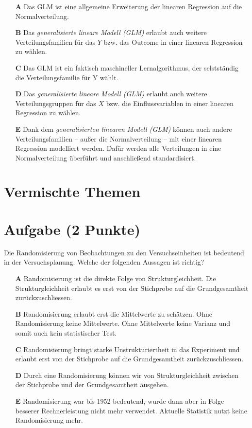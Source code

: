 \documentclass[a4paper, 9pt]{scrartcl}\usepackage[]{graphicx}\usepackage[]{xcolor}
\begin{document}
\begin{enumerate}
\item [\textbf{A} \msquare] Das GLM ist eine allgemeine Erweiterung der linearen Regression auf die Normalverteilung.
\item [\textbf{B} \msquare] Das \textit{generalisierte lineare Modell (GLM)} erlaubt auch weitere Verteilungsfamilien für das $Y$ bzw. das Outcome in einer linearen Regression zu wählen.
\item [\textbf{C} \msquare] Das GLM ist ein faktisch maschineller Lernalgorithmus, der selstständig die Verteilungsfamilie für Y wählt.
\item [\textbf{D} \msquare] Das \textit{generalisierte lineare Modell (GLM)} erlaubt auch weitere Verteilungsgruppen für das $X$ bzw. die Einflussvariablen in einer linearen Regression zu wählen.
\item [\textbf{E} \msquare] Dank dem \textit{generalisierten linearen Modell (GLM)} können auch andere Verteilungsfamilien -- außer die Normalverteilung -- mit einer linearen Regression modelliert werden. Dafür werden alle Verteilungen in eine Normalverteilung überführt und anschließend standardisiert.
\end{enumerate}
\section*{Vermischte Themen}  

\section{Aufgabe \hfill (2 Punkte)}

Die Randomisierung von Beobachtungen zu den Versuchseinheiten
ist bedeutend in der Versuchsplanung. Welche der folgenden Aussagen ist richtig?



\begin{enumerate}
\item [\textbf{A} \msquare] Randomisierung ist die direkte Folge von Strukturgleichheit. Die Strukturgleichheit erlaubt es erst von der Stichprobe auf die Grundgesamtheit zurückzuschliessen.
\item [\textbf{B} \msquare] Randomisierung erlaubt erst die Mittelwerte zu schätzen. Ohne Randomisierung keine Mittelwerte. Ohne Mittelwerte keine Varianz und somit auch kein statistischer Test.
\item [\textbf{C} \msquare] Randomisierung bringt starke Unstrukturiertheit in das Experiment und erlaubt erst von der Stichprobe auf die Grundgesamtheit zurückzuschliessen.
\item [\textbf{D} \msquare] Durch eine Randomisierung können wir von Strukturgleichheit zwischen der Stichprobe und der Grundgesamtheit ausgehen.
\item [\textbf{E} \msquare] Randomisierung war bis 1952 bedeutend, wurde dann aber in Folge besserer Rechnerleistung nicht mehr verwendet. Aktuelle Statistik nutzt keine Randomisierung mehr.
\end{enumerate}
\end{document}
